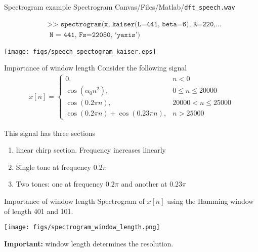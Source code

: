 \documentclass[10pt, aspectratio=169, handout]{beamer}
\begin{document}
\begin{frame}{Spectrogram example}
	Spectrogram Canvas/Files/Matlab/\texttt{dft\_speech.wav}
	
	\begin{align*}
	&\texttt{>> spectrogram(x, kaiser(L=441, beta=6), R=220,...}\\
	&\texttt{ N = 441, Fs=22050, `yaxis')} 
	\end{align*}
	
	\begin{center}
		\texttt{[image: figs/speech\_spectogram\_kaiser.eps]}
	\end{center}
\end{frame}

\begin{frame}{Importance of window length}
Consider the following signal
\begin{align*}
	x[n] = \begin{cases}
	0, & n < 0 \\
	\cos(\alpha_0n^2), & 0 \leq n \leq 20000 \\
	\cos(0.2\pi n), & 20000 < n \leq 25000 \\
	\cos(0.2\pi n) + \cos(0.23\pi n), & n > 25000
	\end{cases}
\end{align*}

This signal has three sections
\begin{enumerate}
	\item linear chirp section. Frequency increases linearly
	\item Single tone at frequency $0.2\pi$
	\item Two tones: one at frequency $0.2\pi$ and another at $0.23\pi$
\end{enumerate}

\end{frame}


\begin{frame}{Importance of window length}
Spectrogram of $x[n]$ using the Hamming window of length 401 and 101.
\begin{center}
	\texttt{[image: figs/spectrogram\_window\_length.png]}
\end{center}

\textbf{Important:} window length determines the resolution.

\end{frame}
\end{document}
